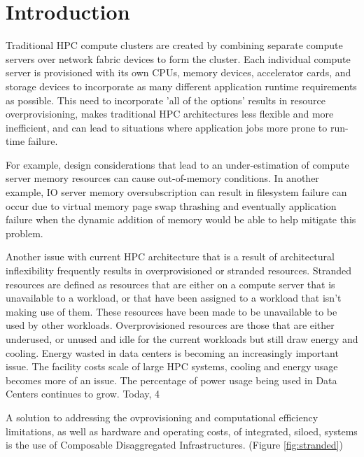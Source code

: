 \section{Introduction}

Traditional HPC compute clusters are created by combining separate compute servers over network fabric devices to form the cluster.  Each individual compute server is provisioned with its own CPUs, memory devices, accelerator cards, and storage devices to incorporate as many different application runtime requirements as possible.\cite{beowulf} This need to incorporate 'all of the options' results in resource overprovisioning, makes traditional HPC architectures less flexible and more inefficient, and can lead to situations where application jobs more prone to run-time failure.    

For example, design considerations that lead to an under-estimation of compute server memory resources can cause out-of-memory conditions.  In another example, IO server memory oversubscription can result in filesystem failure can occur due to virtual memory page swap thrashing and eventually application failure when the dynamic addition of memory would be able to help mitigate this problem.  

Another issue with current HPC architecture that is a result of architectural inflexibility frequently results in overprovisioned or stranded resources.  Stranded resources are defined as resources that are either on a compute server that is unavailable to a workload, or that have been assigned to a workload that isn't making use of them.  These resources have been made to be unavailable to be used by other workloads. Overprovisioned resources are those that are either underused, or unused and idle for the current workloads but still draw energy and cooling.  Energy wasted in data centers is becoming an increasingly important issue.\cite{eere}
The facility costs scale of large HPC systems, cooling and energy usage becomes more of an issue.  The percentage of power usage being used in Data Centers continues to grow.  Today, 4%

A solution to addressing the ovprovisioning and computational efficiency limitations, as well as hardware and operating costs, of integrated, siloed, systems is the use of Composable Disaggregated Infrastructures. (Figure \ref{fig:stranded}) 

